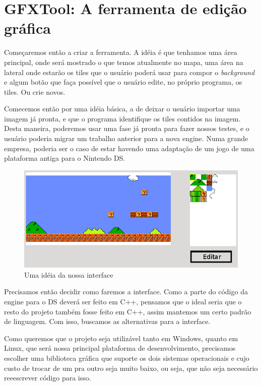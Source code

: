 \section{GFXTool: A ferramenta de edição gráfica}
Começaremos então a criar a ferramenta. A idéia é que tenhamos uma área principal, onde será mostrado o que temos atualmente no mapa, uma área na lateral onde estarão os tiles que o usuário poderá usar para compor o \textit{background} e algum botão que faça possível que o usuário edite, no próprio programa, os tiles. Ou crie novos.

Comecemos então por uma idéia básica, a de deixar o usuário importar uma imagem já pronta, e que o programa identifique os tiles contidos na imagem. Desta maneira, poderemos usar uma fase já pronta para fazer nossos testes, e o usuário poderia migrar um trabalho anterior para a nova engine. Numa grande empresa, poderia ser o caso de estar havendo uma adaptação de um jogo de uma plataforma antiga para o Nintendo DS.

\begin{figure}[h]
\includegraphics[width=\linewidth]{imgs/mockup.png}
\caption{Uma idéia da nossa interface} 
\end{figure}

Precisamos então decidir como faremos a interface. Como a parte do código da engine para o DS deverá ser feito em C++, pensamos que o ideal seria que o resto do projeto também fosse feito em C++, assim mantemos um certo padrão de linguagem. Com isso, buscamos as alternativas para a interface.

Como queremos que o projeto seja utilizável tanto em Windows, quanto em Linux, que será nossa principal plataforma de desenvolvimento, precisamos escolher uma biblioteca gráfica que suporte os dois sistemas operacionais e cujo custo de trocar de um pra outro seja muito baixo, ou seja, que não seja necessário reeescrever código para isso.

